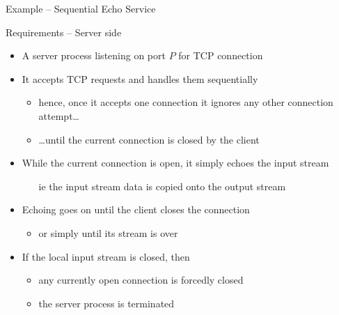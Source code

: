 \documentclass{beamer}\mode<presentation>{\usetheme{AMSBolognaFC}}
\begin{document}
\begin{frame}[c,allowframebreaks]{Example -- Sequential Echo Service}

    \begin{block}{Requirements -- Server side}
        \begin{itemize}
            \item A server process listening on port $P$ for TCP connection
            \item It accepts TCP requests and handles them \alert{sequentially}
            \begin{itemize}
                \item hence, once it accepts one connection it ignores any other connection attempt\ldots
                \item \ldots until the current connection is closed by the client
            \end{itemize}
            \item While the current connection is open, it simply echoes the input stream
            \begin{itemize}
                \item[ie] the input stream data is copied onto the output stream
            \end{itemize}
            \item Echoing goes on until the client closes the connection
            \begin{itemize}
                \item or simply until its stream is over
            \end{itemize}
            \item If the local input stream is closed, then
            \begin{itemize}
                \item any currently open connection is forcedly closed
                \item the server process is terminated
            \end{itemize}
        \end{itemize}
    \end{block}


\end{frame}
\end{document}
